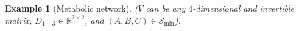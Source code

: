 \documentclass{article}
\newcommand{\R}{\mathbb{R}}
\newcommand{\1}{\mathbbm{1}}
\newcommand{\Sys}{\mathcal{S}}
\newtheorem{example}{Example}
\begin{document}
\begin{example}[Metabolic network]
  ($V$ can be any $4$-dimensional and invertible matrix, $D_{1-3} \in \R^{2 \times 2}$, and $(A,B,C) \in \Sys_{\min}$).
%
%
\end{example}

\appendix
\end{document}
